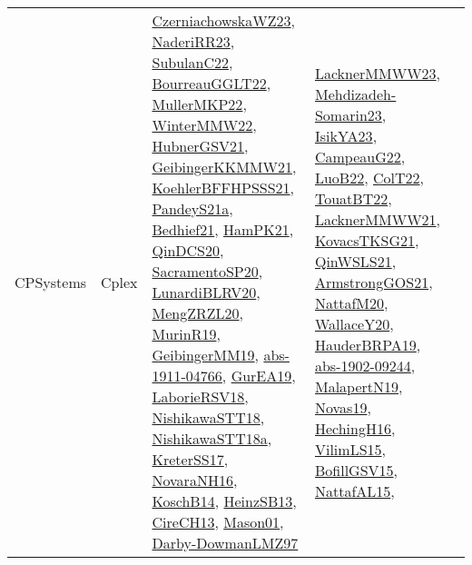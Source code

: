 {\begin{longtable}{lp{3cm}>{\raggedright}p{6cm}>{\raggedright}p{6cm}p{8cm}}
CPSystems & Cplex & \href{articles/CzerniachowskaWZ23.pdf}{CzerniachowskaWZ23}\cite{CzerniachowskaWZ23}, \href{articles/NaderiRR23.pdf}{NaderiRR23}\cite{NaderiRR23}, \href{articles/SubulanC22.pdf}{SubulanC22}\cite{SubulanC22}, \href{articles/BourreauGGLT22.pdf}{BourreauGGLT22}\cite{BourreauGGLT22}, \href{articles/MullerMKP22.pdf}{MullerMKP22}\cite{MullerMKP22}, \href{papers/WinterMMW22.pdf}{WinterMMW22}\cite{WinterMMW22}, \href{articles/HubnerGSV21.pdf}{HubnerGSV21}\cite{HubnerGSV21}, \href{papers/GeibingerKKMMW21.pdf}{GeibingerKKMMW21}\cite{GeibingerKKMMW21}, \href{articles/KoehlerBFFHPSSS21.pdf}{KoehlerBFFHPSSS21}\cite{KoehlerBFFHPSSS21}, \href{articles/PandeyS21a.pdf}{PandeyS21a}\cite{PandeyS21a}, \href{articles/Bedhief21.pdf}{Bedhief21}\cite{Bedhief21}, \href{articles/HamPK21.pdf}{HamPK21}\cite{HamPK21}, \href{articles/QinDCS20.pdf}{QinDCS20}\cite{QinDCS20}, \href{articles/SacramentoSP20.pdf}{SacramentoSP20}\cite{SacramentoSP20}, \href{articles/LunardiBLRV20.pdf}{LunardiBLRV20}\cite{LunardiBLRV20}, \href{articles/MengZRZL20.pdf}{MengZRZL20}\cite{MengZRZL20}, \href{papers/MurinR19.pdf}{MurinR19}\cite{MurinR19}, \href{papers/GeibingerMM19.pdf}{GeibingerMM19}\cite{GeibingerMM19}, \href{articles/abs-1911-04766.pdf}{abs-1911-04766}\cite{abs-1911-04766}, \href{articles/GurEA19.pdf}{GurEA19}\cite{GurEA19}, \href{articles/LaborieRSV18.pdf}{LaborieRSV18}\cite{LaborieRSV18}, \href{papers/NishikawaSTT18.pdf}{NishikawaSTT18}\cite{NishikawaSTT18}, \href{papers/NishikawaSTT18a.pdf}{NishikawaSTT18a}\cite{NishikawaSTT18a}, \href{articles/KreterSS17.pdf}{KreterSS17}\cite{KreterSS17}, \href{articles/NovaraNH16.pdf}{NovaraNH16}\cite{NovaraNH16}, \href{papers/KoschB14.pdf}{KoschB14}\cite{KoschB14}, \href{articles/HeinzSB13.pdf}{HeinzSB13}\cite{HeinzSB13}, \href{papers/CireCH13.pdf}{CireCH13}\cite{CireCH13}, \href{articles/Mason01.pdf}{Mason01}\cite{Mason01}, \href{articles/Darby-DowmanLMZ97.pdf}{Darby-DowmanLMZ97}\cite{Darby-DowmanLMZ97} & \href{articles/LacknerMMWW23.pdf}{LacknerMMWW23}\cite{LacknerMMWW23}, \href{papers/Mehdizadeh-Somarin23.pdf}{Mehdizadeh-Somarin23}\cite{Mehdizadeh-Somarin23}, \href{articles/IsikYA23.pdf}{IsikYA23}\cite{IsikYA23}, \href{articles/CampeauG22.pdf}{CampeauG22}\cite{CampeauG22}, \href{papers/LuoB22.pdf}{LuoB22}\cite{LuoB22}, \href{articles/ColT22.pdf}{ColT22}\cite{ColT22}, \href{papers/TouatBT22.pdf}{TouatBT22}\cite{TouatBT22}, \href{papers/LacknerMMWW21.pdf}{LacknerMMWW21}\cite{LacknerMMWW21}, \href{papers/KovacsTKSG21.pdf}{KovacsTKSG21}\cite{KovacsTKSG21}, \href{articles/QinWSLS21.pdf}{QinWSLS21}\cite{QinWSLS21}, \href{papers/ArmstrongGOS21.pdf}{ArmstrongGOS21}\cite{ArmstrongGOS21}, \href{papers/NattafM20.pdf}{NattafM20}\cite{NattafM20}, \href{articles/WallaceY20.pdf}{WallaceY20}\cite{WallaceY20}, \href{articles/HauderBRPA19.pdf}{HauderBRPA19}\cite{HauderBRPA19}, \href{articles/abs-1902-09244.pdf}{abs-1902-09244}\cite{abs-1902-09244}, \href{papers/MalapertN19.pdf}{MalapertN19}\cite{MalapertN19}, \href{articles/Novas19.pdf}{Novas19}\cite{Novas19}, \href{papers/HechingH16.pdf}{HechingH16}\cite{HechingH16}, \href{papers/VilimLS15.pdf}{VilimLS15}\cite{VilimLS15}, \href{papers/BofillGSV15.pdf}{BofillGSV15}\cite{BofillGSV15}, \href{articles/NattafAL15.pdf}{NattafAL15}\cite{NattafAL15}, 
\end{longtable}}
